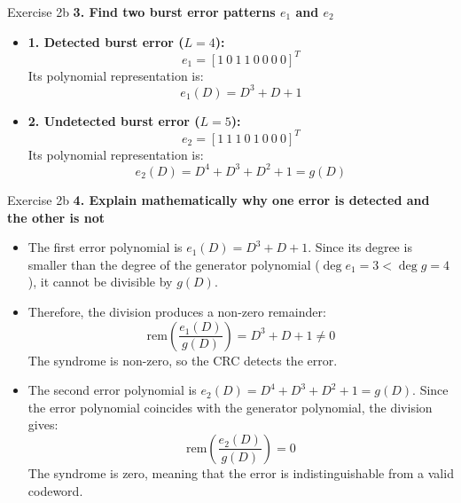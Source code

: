 \documentclass[10pt, aspectratio=169]{beamer}
\newcommand{\question}[1]{{\color{QuestionRed}\textbf{#1}}}
\begin{document}
\begin{frame}{Exercise 2b}
  \question{3. Find two burst error patterns $e_1$ and $e_2$}

  \vspace{0.25cm}
  \begin{itemize}
    \item \textbf{1. Detected burst error ($L = 4$):}
    \[
      e_1 = [1\ 0\ 1\ 1\ 0\ 0\ 0\ 0]^T
    \]
    Its polynomial representation is:
    \[
      e_1(D) = D^3 + D + 1
    \]
    \item \textbf{2. Undetected burst error ($L = 5$):}
    \[
      e_2 = [1\ 1\ 1\ 0\ 1\ 0\ 0\ 0]^T
    \]
    Its polynomial representation is:
    \[
      e_2(D) = D^4 + D^3 + D^2 + 1 = g(D)
    \]
  \end{itemize}
\end{frame}

\begin{frame}{Exercise 2b}
  \question{4. Explain mathematically why one error is detected and the other is not}

  \vspace{0.2cm}
  \small
  \begin{itemize}
    \item The first error polynomial is $e_1(D) = D^3 + D + 1$. Since its degree is smaller than the degree of the generator polynomial ($\deg e_1 = 3 < \deg g = 4$), it cannot be divisible by $g(D)$.
    \item Therefore, the division produces a non-zero remainder:
    \[
      \text{rem}\left(\frac{e_1(D)}{g(D)}\right) = D^3 + D + 1 \ne 0
    \]
    The syndrome is non-zero, so the CRC detects the error.
    \item The second error polynomial is $e_2(D) = D^4 + D^3 + D^2 + 1 = g(D)$. Since the error polynomial coincides with the generator polynomial, the division gives:
    \[
      \text{rem}\left(\frac{e_2(D)}{g(D)}\right) = 0
    \]
    The syndrome is zero, meaning that the error is indistinguishable from a valid codeword.
  \end{itemize}
\end{frame}
\end{document}
